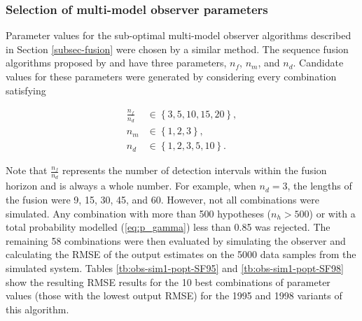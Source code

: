 \subsubsection{Selection of multi-model observer parameters} \label{sim-obs-lin-1-MKF-tuning}

Parameter values for the sub-optimal multi-model observer algorithms described in Section \ref{subsec-fusion} were chosen by a similar method. The sequence fusion algorithms proposed by \cite{robertson_detection_1995} and \cite{robertson_method_1998} have three parameters, $n_f$, $n_m$, and $n_d$. Candidate values for these parameters were generated by considering every combination satisfying

\begin{equation} \label{eq:sim-sys-siso-MKF-SF-param-values}
	\begin{aligned}
		\frac{n_f}{n_d} &\in \left\{3, 5, 10, 15, 20\right\},  \\
		n_m &\in \left\{1, 2, 3\right\},  \\
		n_d &\in \left\{1, 2, 3, 5, 10\right\}.
	\end{aligned}
\end{equation}

Note that $\frac{n_f}{n_d}$ represents the number of detection intervals within the fusion horizon and is always a whole number. For example, when $n_d=3$, the lengths of the fusion were 9, 15, 30, 45, and 60. However, not all combinations were simulated. Any combination with more than 500 hypotheses ($n_h>500$) or with a total probability modelled (\ref{eq:p_gamma}) less than 0.85 was rejected. The remaining 58 combinations were then evaluated by simulating the observer and calculating the \gls{RMSE} of the output estimates on the 5000 data samples from the simulated system. Tables \ref{tb:obs-sim1-popt-SF95} and \ref{tb:obs-sim1-popt-SF98} show the resulting \gls{RMSE} results for the 10 best combinations of parameter values (those with the lowest output \gls{RMSE}) for the 1995 and 1998 variants of this algorithm.


